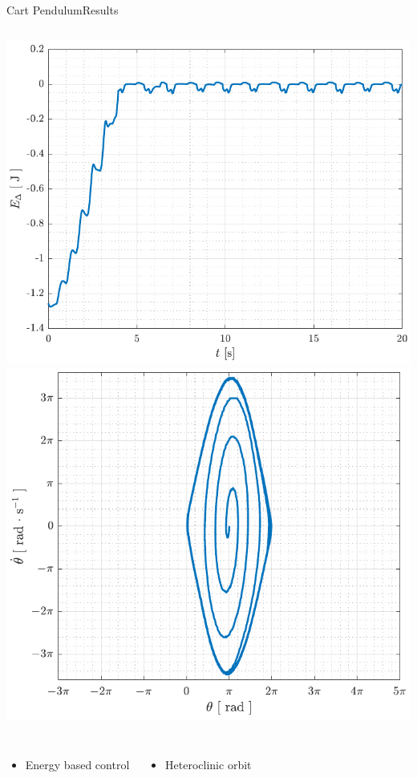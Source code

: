 \begin{frame}{Cart Pendulum}{Results}
  \begin{columns}[c]
      \includegraphics[width=1\textwidth]{figures/Edelta_swing_p08}
      \includegraphics[width=1\textwidth]{figures/phase_swing_p08}
  \end{columns}
  \vspace{12pt}
  \begin{columns}[c]
      \begin{itemize}
        \item Energy based control
      \end{itemize}
      \begin{itemize}
        \item Heteroclinic orbit
      \end{itemize}
  \end{columns}
\end{frame}

